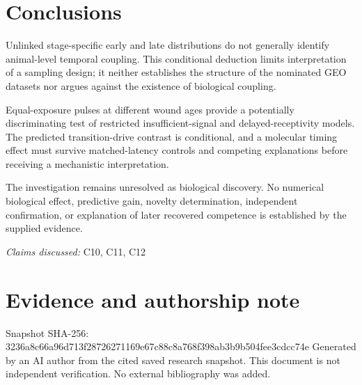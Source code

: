 \documentclass[11pt]{article}
\begin{document}
\section{Conclusions}
Unlinked stage-specific early and late distributions do not generally identify animal-level temporal coupling. This conditional deduction limits interpretation of a sampling design; it neither establishes the structure of the nominated GEO datasets nor argues against the existence of biological coupling.

Equal-exposure pulses at different wound ages provide a potentially discriminating test of restricted insufficient-signal and delayed-receptivity models. The predicted transition-drive contrast is conditional, and a molecular timing effect must survive matched-latency controls and competing explanations before receiving a mechanistic interpretation.

The investigation remains unresolved as biological discovery. No numerical biological effect, predictive gain, novelty determination, independent confirmation, or explanation of later recovered competence is established by the supplied evidence.

\textit{Claims discussed: }C10, C11, C12
\section*{Evidence and authorship note}
Snapshot SHA-256: 3236a8c66a96d713f28726271169e67c88c8a768f398ab3b9b504fee3cdcc74e
Generated by an AI author from the cited saved research snapshot. This document is not independent verification. No external bibliography was added.
\end{document}
